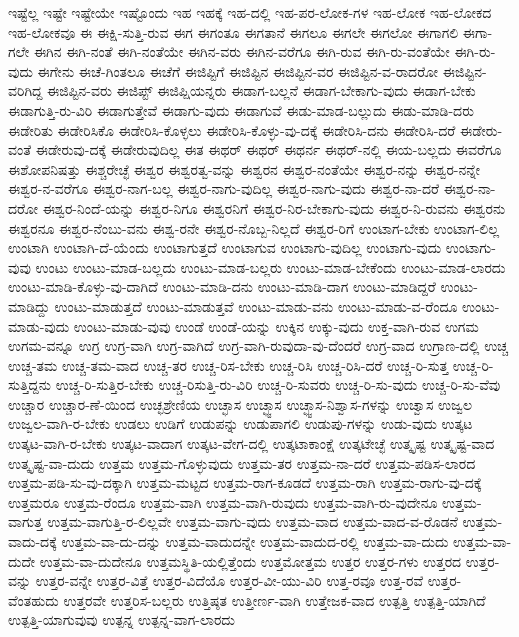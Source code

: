 {ಇಷ್ಟೆಲ್ಲ
ಇಷ್ಟೇ
ಇಷ್ಟೇಯೇ
ಇಷ್ಟೊಂದು
ಇಹ
ಇಹಕ್ಕೆ
ಇಹ-ದಲ್ಲಿ
ಇಹ-ಪರ-ಲೋಕ-ಗಳ
ಇಹ-ಲೋಕ
ಇಹ-ಲೋಕದ
ಇಹ-ಲೋಕವೂ
ಈ
ಈಕ್ಷಿ-ಸುತ್ತಿ-ರುವ
ಈಗ
ಈಗಂತೂ
ಈಗತಾನೆ
ಈಗಲೂ
ಈಗಲೇ
ಈಗಲೋ
ಈಗಾಗಲಿ
ಈಗಾ-ಗಲೇ
ಈಗಿನ
ಈಗಿ-ನಂತೆ
ಈಗಿ-ನಂತೆಯೇ
ಈಗಿನ-ವರು
ಈಗಿನ-ವರೆಗೂ
ಈಗಿ-ರುವ
ಈಗಿ-ರು-ವಂತೆಯೇ
ಈಗಿ-ರು-ವುದು
ಈಗೇನು
ಈಚೆ-ಗಿಂತಲೂ
ಈಚೆಗೆ
ಈಜಿಪ್ಟಿಗೆ
ಈಜಿಪ್ಟಿನ
ಈಜಿಪ್ಟಿನ-ವರ
ಈಜಿಪ್ಟಿನ-ವ-ರಾದರೋ
ಈಜಿಪ್ಟಿನ-ವರಿಗಿದ್ದ
ಈಜಿಪ್ಟಿನ-ವರು
ಈಜಿಪ್ಟ್
ಈಜಿಪ್ಷಿಯನ್ನರು
ಈಡಾಗ-ಬಲ್ಲನೆ
ಈಡಾಗ-ಬೇಕಾಗು-ವುದು
ಈಡಾಗ-ಬೇಕು
ಈಡಾಗುತ್ತಿ-ರು-ವಿರಿ
ಈಡಾಗುತ್ತೇವೆ
ಈಡಾಗು-ವುದು
ಈಡಾಗುವೆ
ಈಡು-ಮಾಡ-ಬಲ್ಲುದು
ಈಡು-ಮಾಡಿ-ದರು
ಈಡೇರಿತು
ಈಡೇರಿಸಿಕೊ
ಈಡೇರಿಸಿ-ಕೊಳ್ಳಲು
ಈಡೇರಿಸಿ-ಕೊಳ್ಳು-ವು-ದಕ್ಕೆ
ಈಡೇರಿಸಿ-ದನು
ಈಡೇರಿಸಿ-ದರೆ
ಈಡೇರು-ವಂತೆ
ಈಡೇರುವು-ದಕ್ಕೆ
ಈಡೇರುವುದಿಲ್ಲ
ಈತ
ಈಥರ್
ಈಥರ್
ಈಥರ್ನ
ಈಥರ್-ನಲ್ಲಿ
ಈಯ-ಬಲ್ಲದು
ಈವರೆಗೂ
ಈಶೋಪನಿಷತ್ತು
ಈಶ್ಚರೇಚ್ಛೆ
ಈಶ್ವರ
ಈಶ್ವರತ್ವ-ವನ್ನು
ಈಶ್ವರನ
ಈಶ್ವರ-ನಂತೆಯೇ
ಈಶ್ವರ-ನನ್ನು
ಈಶ್ವರ-ನನ್ನೇ
ಈಶ್ವರ-ನ-ವರೆಗೂ
ಈಶ್ವರ-ನಾಗ-ಬಲ್ಲ
ಈಶ್ವರ-ನಾಗು-ವುದಿಲ್ಲ
ಈಶ್ವರ-ನಾಗು-ವುದು
ಈಶ್ವರ-ನಾ-ದರೆ
ಈಶ್ವರ-ನಾ-ದರೋ
ಈಶ್ವರ-ನಿಂದೆ-ಯನ್ನು
ಈಶ್ವರ-ನಿಗೂ
ಈಶ್ವರನಿಗೆ
ಈಶ್ವರ-ನಿರ-ಬೇಕಾಗು-ವುದು
ಈಶ್ವರ-ನಿ-ರುವನು
ಈಶ್ವರನು
ಈಶ್ವರನೂ
ಈಶ್ವರ-ನೆಂಬು-ವನು
ಈಶ್ವ-ರನೇ
ಈಶ್ವರ-ನೊಬ್ಬ-ನಿಲ್ಲದೆ
ಈಶ್ವರ-ರಿಗೆ
ಉಂಟಾಗ-ಬೇಕು
ಉಂಟಾಗ-ಲಿಲ್ಲ
ಉಂಟಾಗಿ
ಉಂಟಾಗಿ-ದೆ-ಯೆಂದು
ಉಂಟಾಗುತ್ತದೆ
ಉಂಟಾಗುವ
ಉಂಟಾಗು-ವುದಿಲ್ಲ
ಉಂಟಾಗು-ವುದು
ಉಂಟಾಗು-ವುವು
ಉಂಟು
ಉಂಟು-ಮಾಡ-ಬಲ್ಲದು
ಉಂಟು-ಮಾಡ-ಬಲ್ಲರು
ಉಂಟು-ಮಾಡ-ಬೇಕೆಂದು
ಉಂಟು-ಮಾಡ-ಲಾರದು
ಉಂಟು-ಮಾಡಿ-ಕೊಳ್ಳು-ವು-ದಾಗಿದೆ
ಉಂಟು-ಮಾಡಿ-ದನು
ಉಂಟು-ಮಾಡಿ-ದಾಗ
ಉಂಟು-ಮಾಡಿದ್ದರೆ
ಉಂಟು-ಮಾಡಿದ್ದು
ಉಂಟು-ಮಾಡುತ್ತದೆ
ಉಂಟು-ಮಾಡುತ್ತವೆ
ಉಂಟು-ಮಾಡು-ವನು
ಉಂಟು-ಮಾಡು-ವ-ರೆಂದೂ
ಉಂಟು-ಮಾಡು-ವುದು
ಉಂಟು-ಮಾಡು-ವುವು
ಉಂಡೆ
ಉಂಡೆ-ಯನ್ನು
ಉಕ್ಕಿನ
ಉಕ್ಕು-ವುದು
ಉಕ್ತ-ವಾಗಿ-ರುವ
ಉಗಮ
ಉಗಮ-ವನ್ನೂ
ಉಗ್ರ
ಉಗ್ರ-ವಾಗಿ
ಉಗ್ರ-ವಾಗಿದೆ
ಉಗ್ರ-ವಾಗಿ-ರುವುದಾ-ವು-ದೆಂದರೆ
ಉಗ್ರ-ವಾದ
ಉಗ್ರಾಣ-ದಲ್ಲಿ
ಉಚ್ಚ
ಉಚ್ಚ-ತಮ
ಉಚ್ಚ-ತಮ-ವಾದ
ಉಚ್ಚ-ತರ
ಉಚ್ಚ-ರಿಸ-ಬೇಕು
ಉಚ್ಚ-ರಿಸಿ
ಉಚ್ಚ-ರಿಸಿ-ದರೆ
ಉಚ್ಚ-ರಿ-ಸುತ್ತ
ಉಚ್ಚ-ರಿ-ಸುತ್ತಿದ್ದನು
ಉಚ್ಚ-ರಿ-ಸುತ್ತಿರ-ಬೇಕು
ಉಚ್ಚ-ರಿಸುತ್ತಿ-ರು-ವಿರಿ
ಉಚ್ಚ-ರಿ-ಸುವರು
ಉಚ್ಚ-ರಿ-ಸು-ವುದು
ಉಚ್ಚ-ರಿ-ಸು-ವೆವು
ಉಚ್ಚಾರ
ಉಚ್ಚಾರ-ಣೆ-ಯಿಂದ
ಉಚ್ಛಶ್ರೇಣಿಯ
ಉಚ್ಛಾಸ
ಉಚ್ಛ್ವಾಸ
ಉಚ್ಛ್ವಾಸ-ನಿಶ್ವಾಸ-ಗಳನ್ನು
ಉಚ್ವಾಸ
ಉಜ್ವಲ
ಉಜ್ವಲ-ವಾಗಿ-ರ-ಬೇಕು
ಉಡಲು
ಉಡಿಗೆ
ಉಡುಪನ್ನು
ಉಡುಪಾಗಲಿ
ಉಡುಪು-ಗಳನ್ನು
ಉಡು-ವುದು
ಉತ್ಕಟ
ಉತ್ಕಟ-ವಾಗಿ-ರ-ಬೇಕು
ಉತ್ಕಟ-ವಾದಾಗ
ಉತ್ಕಟ-ವೇಗ-ದಲ್ಲಿ
ಉತ್ಕಟಾಕಾಂಕ್ಷೆ
ಉತ್ಕಟೇಚ್ಛೆ
ಉತ್ಕೃಷ್ಟ
ಉತ್ಕೃಷ್ಟ-ವಾದ
ಉತ್ಕೃಷ್ಟ-ವಾ-ದುದು
ಉತ್ತಮ
ಉತ್ತಮ-ಗೊಳ್ಳುವುದು
ಉತ್ತಮ-ತರ
ಉತ್ತಮ-ನಾ-ದರೆ
ಉತ್ತಮ-ಪಡಿಸ-ಲಾರದ
ಉತ್ತಮ-ಪಡಿ-ಸು-ವು-ದಕ್ಕಾಗಿ
ಉತ್ತಮ-ಮಟ್ಟದ
ಉತ್ತಮ-ರಾಗ-ಕೂಡದೆ
ಉತ್ತಮ-ರಾಗಿ
ಉತ್ತಮ-ರಾಗು-ವು-ದಕ್ಕೆ
ಉತ್ತಮರೂ
ಉತ್ತಮ-ರೆಂದೂ
ಉತ್ತಮ-ವಾಗಿ
ಉತ್ತಮ-ವಾಗಿ-ರುವುದು
ಉತ್ತಮ-ವಾಗಿ-ರು-ವುದೇನೂ
ಉತ್ತಮ-ವಾಗುತ್ತ
ಉತ್ತಮ-ವಾಗುತ್ತಿ-ರ-ಲಿಲ್ಲವೇ
ಉತ್ತಮ-ವಾಗು-ವುದು
ಉತ್ತಮ-ವಾದ
ಉತ್ತಮ-ವಾದ-ವ-ರೊಡನೆ
ಉತ್ತಮ-ವಾದು-ದಕ್ಕೆ
ಉತ್ತಮ-ವಾ-ದು-ದನ್ನು
ಉತ್ತಮ-ವಾದುದನ್ನೇ
ಉತ್ತಮ-ವಾದುದ-ರಲ್ಲಿ
ಉತ್ತಮ-ವಾ-ದುದು
ಉತ್ತಮ-ವಾ-ದುದೇ
ಉತ್ತಮ-ವಾ-ದುದೇನೂ
ಉತ್ತಮಸ್ಥಿತಿ-ಯಲ್ಲಿತ್ತೆಂದು
ಉತ್ತಮೋತ್ತಮ
ಉತ್ತರ
ಉತ್ತರ-ಗಳು
ಉತ್ತರದ
ಉತ್ತರ-ವನ್ನು
ಉತ್ತರ-ವನ್ನೇ
ಉತ್ತರ-ವಿತ್ತೆ
ಉತ್ತರ-ವಿದೆಯೊ
ಉತ್ತರ-ವೀ-ಯು-ವಿರಿ
ಉತ್ತ-ರವೂ
ಉತ್ತ-ರವೆ
ಉತ್ತರ-ವೆಂತಹುದು
ಉತ್ತರವೇ
ಉತ್ತರಿಸ-ಬಲ್ಲರು
ಉತ್ತಿಷ್ಠತ
ಉತ್ತೀರ್ಣ-ವಾಗಿ
ಉತ್ತೇಜಕ-ವಾದ
ಉತ್ಪತ್ತಿ
ಉತ್ಪತ್ತಿ-ಯಾಗಿದೆ
ಉತ್ಪತ್ತಿ-ಯಾಗುವುವು
ಉತ್ಪನ್ನ
ಉತ್ಪನ್ನ-ವಾಗ-ಲಾರದು
}
